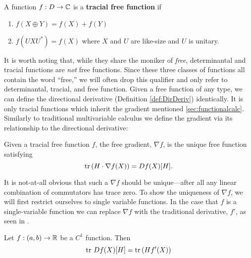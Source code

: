 \begin{definition}%
\label{def:TrFreeFun}
  A function \(f: D \to \mathbb{C} \) is a \textbf{tracial free function} if
  \begin{enumerate}
    \item \(f(X\oplus Y) = f(X)+f(Y)\)
    \item \(f(U X U^*) = f(X)\) where \(X\) and \(U\) are like-size
          and \(U\) is unitary.
  \end{enumerate}
\end{definition}

It is worth noting that, while they share the moniker of \emph{free},
determinantal and tracial functions are \emph{not} free functions.
Since these three classes of functions all contain the word ``free,'' we will
often drop this qualifier and only refer to determinantal, tracial, and free
function.  Given a free function of any type, we can define the directional
derivative (Definition \ref{def:DirDeriv}) identically. It is only tracial functions which inherit
the gradient mentioned \cref{sec:functionalcalc}.  Similarly to traditional multivariable calculus
we define the gradient via its relationship to the directional derivative:
\begin{definition}%
\label{def:FreeGrad}
  Given a tracial free function \(f\), the free gradient, \(\nabla f\), is the
  unique free function satisfying
  \[
    \operatorname{tr} \left( H \cdot \nabla f(X) \right) = Df(X)[H].
  \]
\end{definition}

It is not-at-all obvious that such a \(\nabla f \) should be unique---after all
any linear combination of commutators has trace zero. To show the uniqueness of
\(\nabla f\), we will first restrict ourselves to single variable functions. In the case that \(f\)
is a single-variable function we can replace \(\nabla f\) with the traditional
derivative, \(f'\), as seen in
\cite[Thm 3.3]{pascoeTrace2020}.
\begin{theorem}
  Let \(f: (a,b)\to \mathbb{R} \) be a \(C^1\) function. Then
  \[
    \operatorname{tr} \, Df(X)[H] = \operatorname{tr} \left( Hf'(X) \right)
  \]
\end{theorem}

